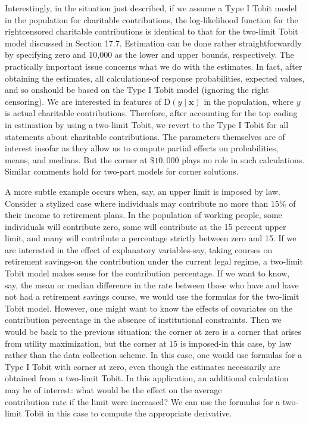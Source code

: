 \documentclass[10pt]{article}
\begin{document}
Interestingly, in the situation just described, if we assume a Type I Tobit model in the population for charitable contributions, the log-likelihood function for the rightcensored charitable contributions is identical to that for the two-limit Tobit model discussed in Section 17.7. Estimation can be done rather straightforwardly by specifying zero and 10,000 as the lower and upper bounds, respectively. The practically important issue concerns what we do with the estimates. In fact, after obtaining the estimates, all calculations-of response probabilities, expected values, and so onshould be based on the Type I Tobit model (ignoring the right censoring). We are interested in features of $\mathrm{D}(y \mid \mathbf{x})$ in the population, where $y$ is actual charitable contributions. Therefore, after accounting for the top coding in estimation by using a two-limit Tobit, we revert to the Type I Tobit for all statements about charitable contributions. The parameters themselves are of interest insofar as they allow us to compute partial effects on probabilities, means, and medians. But the corner at $\$ 10,000$ plays no role in such calculations. Similar comments hold for two-part models for corner solutions.

A more subtle example occurs when, say, an upper limit is imposed by law. Consider a stylized case where individuals may contribute no more than $15 \%$ of their income to retirement plans. In the population of working people, some individuals will contribute zero, some will contribute at the 15 percent upper limit, and many will contribute a percentage strictly between zero and 15. If we are interested in the effect of explanatory variables-say, taking courses on retirement savings-on the contribution under the current legal regime, a two-limit Tobit model makes sense for the contribution percentage. If we want to know, say, the mean or median difference in the rate between those who have and have not had a retirement savings course, we would use the formulas for the two-limit Tobit model. However, one might want to know the effects of covariates on the contribution percentage in the absence of institutional constraints. Then we would be back to the previous situation: the corner at zero is a corner that arises from utility maximization, but the corner at 15 is imposed-in this case, by law rather than the data collection scheme. In this case, one would use formulas for a Type I Tobit with corner at zero, even though the estimates necessarily are obtained from a two-limit Tobit. In this application, an additional calculation may be of interest: what would be the effect on the average\\
contribution rate if the limit were increased? We can use the formulas for a two-limit Tobit in this case to compute the appropriate derivative.
\end{document}
